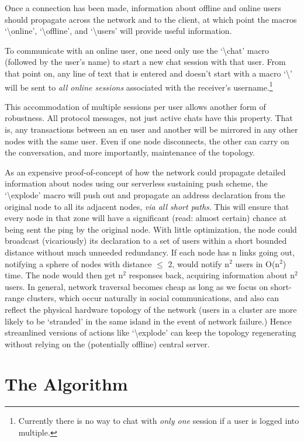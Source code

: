 \documentclass[11pt]{article}
\begin{document}
Once a connection has been made, information about offline and online users should propagate across the network and to the client, at which point the macros `\textbackslash online', `\textbackslash offline', and `\textbackslash users' will provide useful information.

To communicate with an online user, one need only use the `\textbackslash chat' macro (followed by the user's name) to start a new chat session with that user. From that point on, any line of text that is entered and doesn't start with a macro `\textbackslash' will be sent to \emph{all online sessions} associated with the receiver's username.\footnote{Currently there is no way to chat with \emph{only one} session if a user is logged into multiple.}

This accommodation of multiple sessions per user allows another form of robustness. All protocol messages, not just active chats have this property. That is, any transactions between an en user and another will be mirrored in any other nodes with the same user. Even if one node disconnects, the other can carry on the conversation, and more importantly, maintenance of the topology.

As an expensive proof-of-concept of how the network could propagate detailed information about nodes using our serverless sustaining push scheme, the `\textbackslash explode' macro will push out and propagate an address declaration from the original node to all its adjacent nodes, \emph{via all short paths}. This will ensure that every node in that zone will have a significant (read: almost certain) chance at being sent the ping by the original node. With little optimization, the node could broadcast (vicariously) its declaration to a set of users within a short bounded distance without much unneeded redundancy. If each node has n links going out, notifying a sphere of nodes with distance $\leq$ 2, would notify n$^2$ users in O(n$^2$) time. The node would then get n$^2$ responses back, acquiring information about n$^2$ users. In general, network traversal becomes cheap as long as we focus on short-range clusters, which occur naturally in social communications, and also can reflect the physical hardware topology of the network (users in a cluster are more likely to be `stranded' in the same island in the event of network failure.) Hence streamlined versions of actions like `\textbackslash explode' can keep the topology regenerating without relying on the (potentially offline) central server.

\section{The Algorithm}
\end{document}
